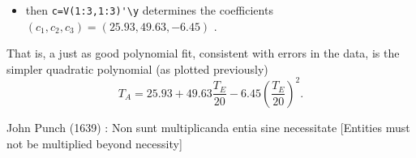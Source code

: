 \begin{example}
\begin{solution}
\begin{enumerate}
\begin{itemize}
\item then \verb|c=V(1:3,1:3)'\y| determines the coefficients \((c_1,c_2,c_3)=(25.93,49.63,-6.45)\) \twodp.
\end{itemize}
That is, a just as good polynomial fit, consistent with errors in the data, is the simpler quadratic polynomial (as plotted previously)
\begin{equation*}
T_A=25.93+49.63\frac{T_E}{20} 
-6.45\left(\frac{T_E}{20}\right)^2.
\end{equation*}
\end{enumerate}
\end{solution}
\end{example}



\begin{quoted}{John Punch (1639)}
: Non sunt multiplicanda entia sine necessitate
[Entities must not be multiplied beyond necessity]
\end{quoted}
\begin{comment}
``We consider it a good principle to explain the phenomena by the simplest hypothesis possible." Ptolemy (c.\textsc{ad}90--168)
\end{comment}




